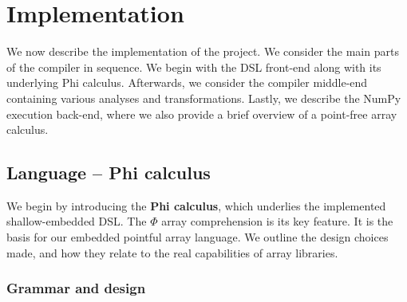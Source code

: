 \chapter{Implementation}

We now describe the implementation of the project. We consider the main parts of the compiler in sequence. We begin with the DSL front-end along with its underlying Phi calculus. Afterwards, we consider the compiler middle-end containing various analyses and transformations. Lastly, we describe the NumPy execution back-end, where we also provide a brief overview of a point-free array calculus.


\section{Language -- Phi calculus}

We begin by introducing the \textbf{Phi calculus}, which underlies the implemented shallow-embedded DSL. The $\Phi$ array comprehension is its key feature. It is the basis for our embedded pointful array language. We outline the design choices made, and how they relate to the real capabilities of array libraries.

\subsection{Grammar and design}

\newcommand{\philet}[3]{\mathrm{let}\,{#1}={#2}\,\mathrm{in}\,{#3}}
\newcommand{\phivec}[3]{\Phi\, {#1}[{#2}] \ldotp {#3}}
\newcommand{\phifold}[5]{\mathrm{fold}\,{#1}[{#2}]\,\mathrm{over}\,{#3} = {#4}\,\mathrm{by}\,{#5}}
\newcommand{\phipair}[2]{\left\langle {#1}, {#2} \right\rangle}
\newcommand{\phifst}[1]{\mathrm{fst}\,{#1}}
\newcommand{\phisnd}[1]{\mathrm{snd}\,{#1}}
\newcommand{\phisize}[2]{\mathrm{size}_{#2}\, {#1}}
\newcommand{\phiasserteq}[2]{\mathrm{assert}\,{#1}={#2}}

